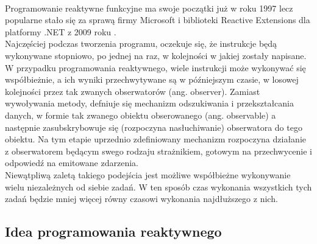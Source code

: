 \documentclass[12pt,oneside,a4paper]{report}
\begin{document}
\paragraph{}Programowanie reaktywne funkcyjne ma swoje początki już w roku 1997 \cite{beginningOfRx} lecz popularne stało się za sprawą firmy Microsoft i biblioteki Reactive Extensions dla platformy .NET z 2009 roku \cite{rxMicrosoftYear}.\\
Najczęściej podczas tworzenia programu, oczekuje się, że instrukcje będą wykonywane stopniowo, po jednej na raz, w kolejności w jakiej zostały napisane. W przypadku programowania reaktywnego, wiele instrukcji może wykonywać się współbieżnie, a ich wyniki przechwytywane są w późniejszym czasie, w losowej kolejności przez tak zwanych obserwatorów (ang. observer). Zamiast wywoływania metody, defniuje się mechanizm odszukiwania i przekształcania danych, w formie tak zwanego obiektu obserowanego (ang. observable) a następnie zasubskrybowuje się (rozpoczyna nasłuchiwanie) obserwatora do tego obiektu. Na tym etapie uprzednio zdefiniowany mechanizm rozpoczyna działanie z obserwatorem będącym swego rodzaju strażnikiem, gotowym na przechwycenie i odpowiedź na emitowane zdarzenia.\\
Niewątpliwą zaletą takiego podejścia jest możliwe współbieżne wykonywanie wielu niezależnych od siebie zadań. W ten sposób czas wykonania wszystkich tych zadań będzie mniej więcej równy czasowi wykonania najdłuższego z nich.
\subsection{Idea programowania reaktywnego}
\end{document}
